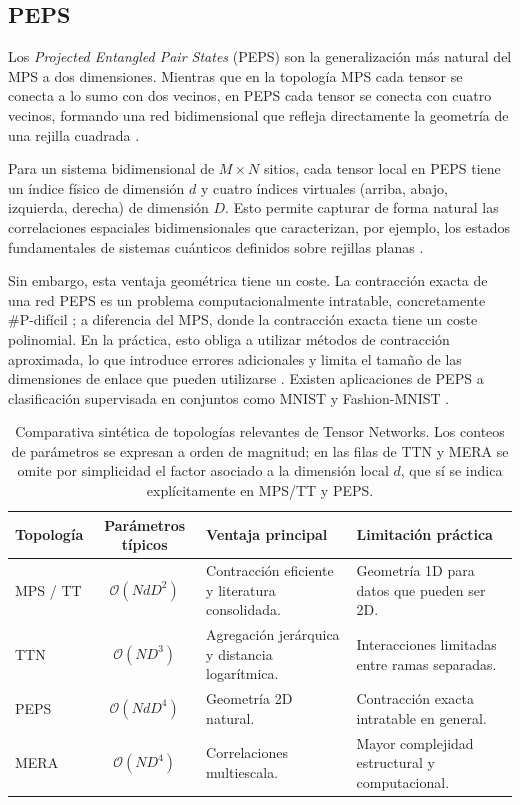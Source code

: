 \subsection{PEPS}

Los \textit{Projected Entangled Pair States} (PEPS) son la generalización más natural del MPS a dos dimensiones. Mientras que en la topología MPS cada tensor se conecta a lo sumo con dos vecinos, en PEPS cada tensor se conecta con cuatro vecinos, formando una red bidimensional que refleja directamente la geometría de una rejilla cuadrada .

Para un sistema bidimensional de $M \times N$ sitios, cada tensor local en PEPS tiene un índice físico de dimensión $d$ y cuatro índices virtuales (arriba, abajo, izquierda, derecha) de dimensión $D$. Esto permite capturar de forma natural las correlaciones espaciales bidimensionales que caracterizan, por ejemplo, los estados fundamentales de sistemas cuánticos definidos sobre rejillas planas .
 
Sin embargo, esta ventaja geométrica tiene un coste. La contracción exacta de una red PEPS es un problema computacionalmente intratable, concretamente \#P-difícil ; a diferencia del MPS, donde la contracción exacta tiene un coste polinomial. En la práctica, esto obliga a utilizar métodos de contracción aproximada, lo que introduce errores adicionales y limita el tamaño de las dimensiones de enlace que pueden utilizarse . Existen aplicaciones de PEPS a clasificación supervisada en conjuntos como MNIST y Fashion-MNIST .

\begin{table}[H]
\centering
\renewcommand{\arraystretch}{1.3}
\begin{tabularx}{\textwidth}{|l|c|X|X|}
\hline
\textbf{Topología} & \textbf{Parámetros típicos} & \textbf{Ventaja principal} & \textbf{Limitación práctica} \\
\hline
MPS / TT & $\mathcal{O}(NdD^2)$ & Contracción eficiente y literatura consolidada. & Geometría 1D para datos que pueden ser 2D. \\
\hline
TTN & $\mathcal{O}(ND^3)$ & Agregación jerárquica y distancia logarítmica. & Interacciones limitadas entre ramas separadas. \\
\hline
PEPS & $\mathcal{O}(NdD^4)$ & Geometría 2D natural. & Contracción exacta intratable en general. \\
\hline
MERA & $\mathcal{O}(ND^4)$ & Correlaciones multiescala. & Mayor complejidad estructural y computacional. \\
\hline
\end{tabularx}
\caption{Comparativa sintética de topologías relevantes de Tensor Networks. Los conteos de parámetros se expresan a orden de magnitud; en las filas de TTN y MERA se omite por simplicidad el factor asociado a la dimensión local $d$, que sí se indica explícitamente en MPS/TT y PEPS.}
\label{tab: comparativa_topologias}
\end{table}

